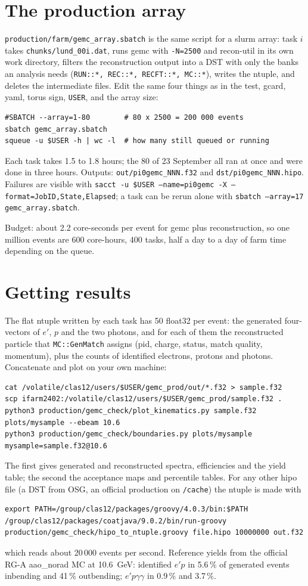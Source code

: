 \documentclass[11pt]{article}
\begin{document}
\section{The production array}
\texttt{production/farm/gemc\_array.sbatch} is the same script for a slurm array: task $i$ takes
\texttt{chunks/lund\_00i.dat}, runs gemc with \texttt{-N=2500} and recon-util in its own work
directory, filters the reconstruction output into a DST with only the banks an analysis needs
(\texttt{RUN::*, REC::*, RECFT::*, MC::*}), writes the ntuple, and deletes the intermediate files.
Edit the same four things as in the test, gcard, yaml, torus sign, \texttt{USER}, and the array
size:
\begin{lstlisting}
#SBATCH --array=1-80        # 80 x 2500 = 200 000 events
sbatch gemc_array.sbatch
squeue -u $USER -h | wc -l  # how many still queued or running
\end{lstlisting}
Each task takes 1.5 to 1.8 hours; the 80 of 23 September all ran at once and were done in three
hours. Outputs: \texttt{out/pi0gemc\_NNN.f32} and \texttt{dst/pi0gemc\_NNN.hipo}. Failures are visible
with \texttt{sacct -u \$USER --name=pi0gemc -X --format=JobID,State,Elapsed}; a task can be rerun
alone with \texttt{sbatch --array=17 gemc\_array.sbatch}.

Budget: about 2.2 core-seconds per event for gemc plus reconstruction, so one million events
are 600 core-hours, 400 tasks, half a day to a day of farm time depending on the queue.

\section{Getting results}
The flat ntuple written by each task has 50 float32 per event: the generated four-vectors of
$e'$, $p$ and the two photons, and for each of them the reconstructed particle that
\texttt{MC::GenMatch} assigns (pid, charge, status, match quality, momentum), plus the counts of
identified electrons, protons and photons. Concatenate and plot on your own machine:
\begin{lstlisting}
cat /volatile/clas12/users/$USER/gemc_prod/out/*.f32 > sample.f32
scp ifarm2402:/volatile/clas12/users/$USER/gemc_prod/sample.f32 .
python3 production/gemc_check/plot_kinematics.py sample.f32 plots/mysample --ebeam 10.6
python3 production/gemc_check/boundaries.py plots/mysample mysample=sample.f32@10.6
\end{lstlisting}
The first gives generated and reconstructed spectra, efficiencies and the yield table; the second
the acceptance maps and percentile tables. For any other hipo file (a DST from OSG, an official
production on \texttt{/cache}) the ntuple is made with
\begin{lstlisting}
export PATH=/group/clas12/packages/groovy/4.0.3/bin:$PATH
/group/clas12/packages/coatjava/9.0.2/bin/run-groovy production/gemc_check/hipo_to_ntuple.groovy file.hipo 10000000 out.f32
\end{lstlisting}
which reads about 20\,000 events per second. Reference yields from the official RG-A aao\_norad
MC at 10.6~GeV: identified $e'p$ in 5.6\,\% of generated events inbending and 41\,\% outbending;
$e'p\gamma\gamma$ in 0.9\,\% and 3.7\,\%.
\end{document}
